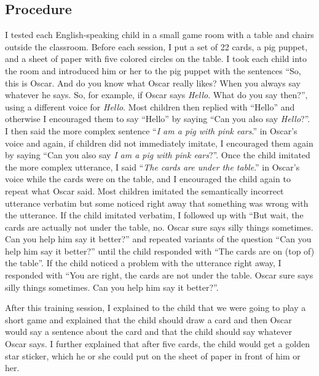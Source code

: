 \documentclass[lucida]{sp} %
\begin{document}
\subsection{Procedure}

I tested each English-speaking child in a small game room with a table and chairs outside the classroom. Before each session, I put a set of 22 cards, a pig puppet, and a sheet of paper with five colored circles on the table. I took each child into the room and introduced him or her to the pig puppet with the sentences ``So, this is Oscar.  And do you know what Oscar really likes? When you always say whatever he says. So, for example, if Oscar says \textit{Hello}. What do you say then?'', using a different voice for \textit{Hello}. Most children then replied with ``Hello'' and otherwise I encouraged them to say ``Hello'' by saying ``Can you also say \textit{Hello}?''. I then said the more complex sentence ``\textit{I am a pig with pink ears}.'' in Oscar's voice and again, if children did not immediately imitate, I encouraged them again by saying ``Can you also say \textit{I am a pig with pink ears}?''. Once the child imitated the more complex utterance, I said ``\textit{The cards are under the table}.'' in Oscar's voice while the cards were on the table,  and I encouraged the child again to repeat what Oscar said. Most children imitated the semantically incorrect utterance verbatim but some noticed right away that something was wrong with the utterance. If the child imitated verbatim, I followed up with ``But wait, the cards are actually not under the table, no. Oscar sure says silly things sometimes. Can you help him say it better?'' and repeated variants of the question ``Can you help him say it better?'' until the child responded with ``The cards are on (top of) the table''. If the child noticed a problem with the utterance right away, I responded with ``You are right, the cards are not under the table. Oscar sure says silly things sometimes. Can you help him say it better?''.

After this training session, I explained to the child that we were going to play a short game and explained that the child should draw a card and then Oscar would say a sentence about the card and that the child should say whatever Oscar says. I further explained that after five cards, the child would get a golden star sticker, which he or she could put on the sheet of paper in front of him or her.
\end{document}
